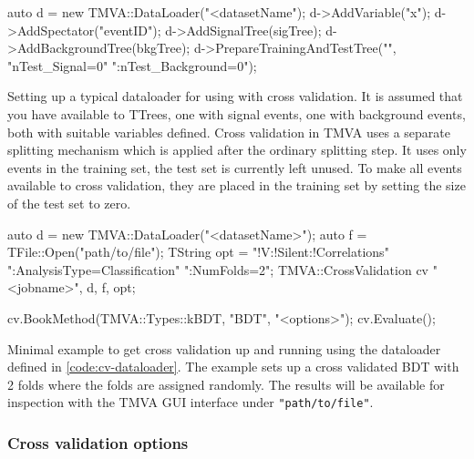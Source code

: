 \begin{codeexample}
\begin{tmvacode}
auto d = new TMVA::DataLoader("<datasetName");
d->AddVariable("x");
d->AddSpectator("eventID");
d->AddSignalTree(sigTree);
d->AddBackgroundTree(bkgTree);
d->PrepareTrainingAndTestTree("", "nTest_Signal=0"
                                  ":nTest_Background=0");
\end{tmvacode}
\caption[.]{\codeexampleCaptionSize
Setting up a typical dataloader for using with cross validation. It is assumed that you have available to TTrees, one with signal events, one with background events, both with suitable variables defined.
Cross validation in TMVA uses a separate splitting mechanism which is applied after the ordinary splitting step. It uses only events in the training set, the test set is currently left unused. To make all events available to cross validation, they are placed in the training set by setting the size of the test set to zero.
}
\label{code:cv-dataloader}
\end{codeexample}

\begin{codeexample}
\begin{tmvacode}
auto d = new TMVA::DataLoader("<datasetName>");
auto f = TFile::Open("path/to/file");
TString opt = "!V:!Silent:!Correlations"
              ":AnalysisType=Classification"
              ":NumFolds=2";
TMVA::CrossValidation cv {"<jobname>", d, f, opt};

cv.BookMethod(TMVA::Types::kBDT, "BDT", "<options>");
cv.Evaluate();
\end{tmvacode}
\caption[.]{\codeexampleCaptionSize Minimal example to get cross validation up and running using the dataloader defined in \ref{code:cv-dataloader}. The example sets up a cross validated BDT with 2 folds where the folds are assigned randomly. The results will be available for inspection with the TMVA GUI interface under \texttt{"path/to/file"}.}
\label{code:cv-minimal}
\end{codeexample}











\subsubsection{Cross validation options}

